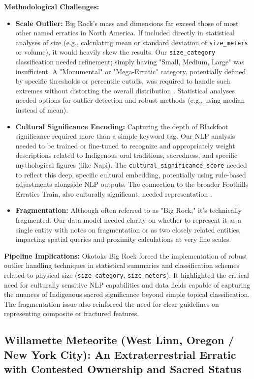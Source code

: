 \textbf{Methodological Challenges:}
\begin{itemize}
    \item \textbf{Scale Outlier:} Big Rock's mass and dimensions far exceed those of most other named erratics in North America. If included directly in statistical analyses of size (e.g., calculating mean or standard deviation of \texttt{size\_meters} or volume), it would heavily skew the results. Our \texttt{size\_category} classification needed refinement; simply having "Small, Medium, Large" was insufficient. A "Monumental" or "Mega-Erratic" category, potentially defined by specific thresholds or percentile cutoffs, was required to handle such extremes without distorting the overall distribution \cite{Cuffey2010}. Statistical analyses needed options for outlier detection and robust methods (e.g., using median instead of mean).
    \item \textbf{Cultural Significance Encoding:} Capturing the depth of Blackfoot significance required more than a simple keyword tag. Our NLP analysis needed to be trained or fine-tuned to recognize and appropriately weight descriptions related to Indigenous oral traditions, sacredness, and specific mythological figures (like Napi). The \texttt{cultural\_significance\_score} needed to reflect this deep, specific cultural embedding, potentially using rule-based adjustments alongside NLP outputs. The connection to the broader Foothills Erratics Train, also culturally significant, needed representation \cite{Klassen1995}.
    \item \textbf{Fragmentation:} Although often referred to as "Big Rock," it's technically fragmented. Our data model needed clarity on whether to represent it as a single entity with notes on fragmentation or as two closely related entities, impacting spatial queries and proximity calculations at very fine scales.
\end{itemize}

\textbf{Pipeline Implications:} Okotoks Big Rock forced the implementation of robust outlier handling techniques in statistical summaries and classification schemes related to physical size (\texttt{size\_category}, \texttt{size\_meters}). It highlighted the critical need for culturally sensitive NLP capabilities and data fields capable of capturing the nuances of Indigenous sacred significance beyond simple topical classification. The fragmentation issue also reinforced the need for clear guidelines on representing composite or fractured features.

\subsection{Willamette Meteorite (West Linn, Oregon / New York City): An Extraterrestrial Erratic with Contested Ownership and Sacred Status}
\label{subsec:willamette}

